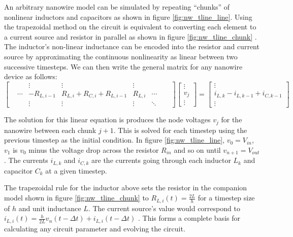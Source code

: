 An arbitrary nanowire model can be simulated by repeating ``chunks'' of nonlinear inductors and capacitors
as shown in figure \ref{fig:nw_tline_line}. Using the trapezoidal method on the circuit is equivalent 
to converting each element to a current source and resistor in parallel as shown in figure \ref{fig:nw_tline_chunk} \cite{numerical_integration}. The inductor's non-linear inductance can be encoded
into the resistor and current source by approximating the continuous nonlinearity as linear between two 
successive timesteps. We can then write the general matrix for any nanowire device as follows:
\begin{equation*}
    \begin{bmatrix}
     && \vdots & \vdots & \vdots & & & \\
    &\cdots & -R_{L, i-1} & R_{L, i} + R_{C, i} + R_{L, i-1} & R_{L, i} & \cdots\\
    && \vdots & \vdots & \vdots & \ddots
    \end{bmatrix}
    \begin{bmatrix}
    \vdots \\ v_j\\ \vdots
    \end{bmatrix}=
    \begin{bmatrix}
    \vdots \\ i_{L, k} - i_{L, k-1} + i_{C, k-1}\\ \vdots
    \end{bmatrix}
\end{equation*}

The solution for this linear equation is produces the node voltages $v_j$ for the nanowire
between each chunk $j+1$. This is solved for each timestep using the previous timestep
as the initial condition.
In figure \ref{fig:nw_tline_line}, $v_0 = V_{in}$, $v_1$ is $v_0$ minus the voltage drop across
the resistor $R_{in}$ and so on until $v_{n+1}=V_{out}$. The currents $i_{L, k}$ and $i_{C, k}$ 
are the currents going through each inductor $L_k$ and capacitor $C_k$ at a given timestep.

The trapezoidal rule for the inductor above sets the resistor in the companion model shown in figure
\ref{fig:nw_tline_chunk} to $R_{L, i}(t) = \frac{2L}{h}$ for a timestep size of $h$ and unit inductance
$L$. The current source's value would correspond to $i_{L, i}(t) = \frac{h}{2L}v_n(t-\Delta t)+i_{L, i}(t-\Delta t)$ \cite{numerical_integration}. This forms a complete basis for calculating any circuit
parameter and evolving the circuit. 

